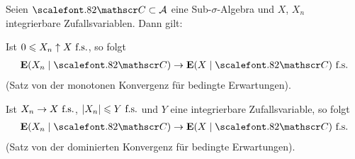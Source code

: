 \begin{prop}
\label{prop:10.6}
Seien ${\CC}\subset {\AA}$ eine Sub-$\sigma$-Algebra und $X$, $X_n$
integrierbare Zufallsvariablen. Dann gilt:
\begin{propenum}
\item Ist $0 \leqslant X_n \uparrow X \ \text{f.s.}$, so folgt
\begin{align*}
\E(X_n\mid {\CC}) \to \E(X\mid {\CC}) \fs
\end{align*}
(Satz von der monotonen Konvergenz für bedingte Erwartungen).
\item Ist $ X_n \to X\ \text{f.s.}$, $|X_n| \leqslant Y\ \text{f.s.}$  und
$Y$ eine integrierbare Zufallsvariable, so folgt
\begin{align*}
\E(X_n\mid {\CC}) \to \E(X\mid {\CC}) \fs
\end{align*}
(Satz von der dominierten Konvergenz für bedingte Erwartungen).\fishhere
\end{propenum}
\end{prop}
